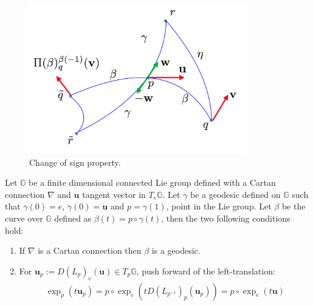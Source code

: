 \begin{figure}[htbp]
	\centering
	\includegraphics[width=9.5cm]{figures/sign_1.png}
	\caption{Change of sign property.}
	\label{fig:sign_propr}
\end{figure}

\begin{lemma}
	Let $\mathbb{G}$ be a finite dimensional connected Lie group defined with a Cartan connection $\nabla$ and $\mathbf{u}$ tangent vector in $ T_{e}\mathbb{G}$. Let $\gamma$ be a geodesic defined on $\mathbb{G}$ such that $\gamma(0) = e$, $\dot{\gamma}(0) =\mathbf{u}$ and $p = \gamma(1)$, point in the Lie group. Let $\beta$ be the curve over $\mathbb{G}$ defined as $\beta(t) = p\circ \gamma(t)$, then the two following conditions hold:
	\begin{enumerate}
		\item If $\nabla$ is a Cartan connection then $\beta$ is a geodesic.
		\item For $\mathbf{u}_{p} := D(L_{p})_{e}(\mathbf{u}) \in T_{p}\mathbb{G}$, push forward of the left-translation:
		\begin{align}\label{eq:lemma_pt}
		\exp_{p}(t\mathbf{u}_{p}) = p\circ \exp_{e}( t D(L_{p^{-1}})_{p}(\mathbf{u}_{p}) ) 
		= p\circ \exp_{e}(t\mathbf{u})
		\end{align}
	\end{enumerate}
\end{lemma}

